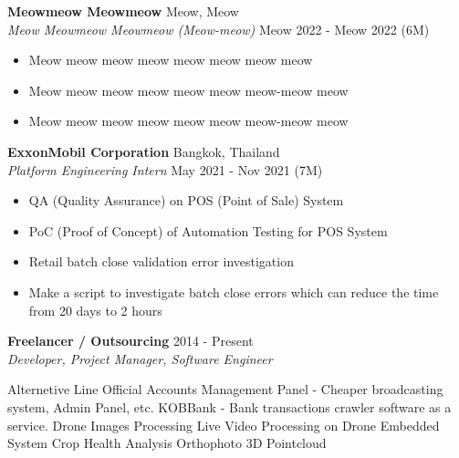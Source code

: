 \vspace{-1mm}
\textbf{Meowmeow Meowmeow} \hfill  Meow, Meow\\
\textit{Meow Meowmeow Meowmeow (Meow-meow)} \hfill Meow 2022 - Meow 2022 (6M)\\
\vspace{-1mm}
\begin{itemize}
	\item Meow meow meow meow meow meow meow meow
	\item Meow meow meow meow meow meow meow-meow meow
	\item Meow meow meow meow meow meow meow-meow meow
\end{itemize}
\vspace{-1mm}
\textbf{ExxonMobil Corporation} \hfill Bangkok, Thailand\\
\textit{Platform Engineering Intern} \hfill May 2021 - Nov 2021 (7M)\\
\vspace{-1mm}
\begin{itemize}
	\item QA (Quality Assurance) on POS (Point of Sale) System
	\item PoC (Proof of Concept) of Automation Testing for POS System
	\item Retail batch close validation error investigation
	\item Make a script to investigate batch close errors which can reduce the time from 20 days to 2 hours
\end{itemize}
\vspace{-1mm}
\textbf{Freelancer / Outsourcing} \hfill 2014 - Present\\
\textit{Developer, Project Manager, Software Engineer}\\
\vspace{-1mm}
\begin{outline}
	    \1 Alternetive Line Official Accounts Management Panel - Cheaper broadcasting system, Admin Panel, etc.
	    \1 KOBBank - Bank transactions crawler software as a service.
		\1 Drone Images Processing 
			\2 Live Video Processing on Drone Embedded System
			\2 Crop Health Analysis
			\2 Orthophoto
			\2 3D Pointcloud
\end{outline}
\vspace{2mm}


